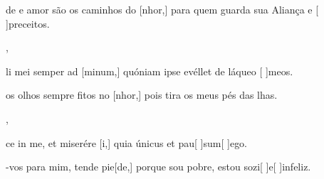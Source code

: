 {    {\item {}de e amor são os caminhos do [nhor,] para quem guarda sua Aliança e [ ]{pre}{cei}tos.~\Antiphona},
  {\item {}li mei semper ad [minum,] quóniam ipse evéllet de láqueo [ ]{me}os.~\Antiphona}%
    {\item {} os olhos sempre fitos no [nhor,] pois tira os meus pés das lhas.~\Antiphona},
  {\item {}ce in me, et miserére [i,] quia únicus et pau[ ]{sum}[ ]{e}go.~\Antiphona}%
    {\item {}-vos para mim, tende pie[de,] porque sou pobre, estou sozi[ ]{e}[ ]{in}feliz.~\Antiphona}
}